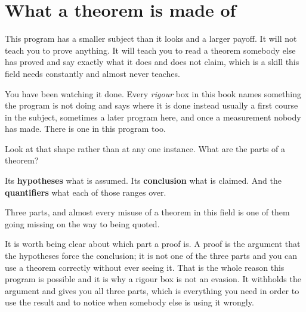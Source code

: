 \section{What a theorem is made of}
\label{sec:P14-parts}

\begin{fr}
This program has a smaller subject than it looks and a larger payoff. It will
not teach you to prove anything. It will teach you to read a theorem somebody
else has proved and say exactly what it does and does not claim, which is a
skill this field needs constantly and almost never teaches.

You have been watching it done. Every \emph{rigour} box in this book names
something the program is not doing and says where it is done instead \dash{}
usually a first course in the subject, sometimes a later program here, and once
a measurement nobody has made. There is one in this program too.

Look at that shape rather than at any one instance. What are the parts of a
theorem?
\dotline
\nextframe
\end{fr}

\begin{fr}
\begin{ansblock}
Its \textbf{hypotheses} \dash{} what is assumed. Its \textbf{conclusion}
\dash{} what is claimed. And the \textbf{quantifiers} \dash{} what each of
those ranges over.
\end{ansblock}

Three parts, and almost every misuse of a theorem in this field is one of them
going missing on the way to being quoted.

\begin{note}
It is worth being clear about which part a proof is. A proof is the argument
that the hypotheses force the conclusion; it is not one of the three parts and
you can use a theorem correctly without ever seeing it. That is the whole
reason this program is possible \dash{} and it is why a rigour box is not an
evasion. It withholds the argument and gives you all three parts, which is
everything you need in order to use the result and to notice when somebody
else is using it wrongly.
\end{note}

\end{fr}

